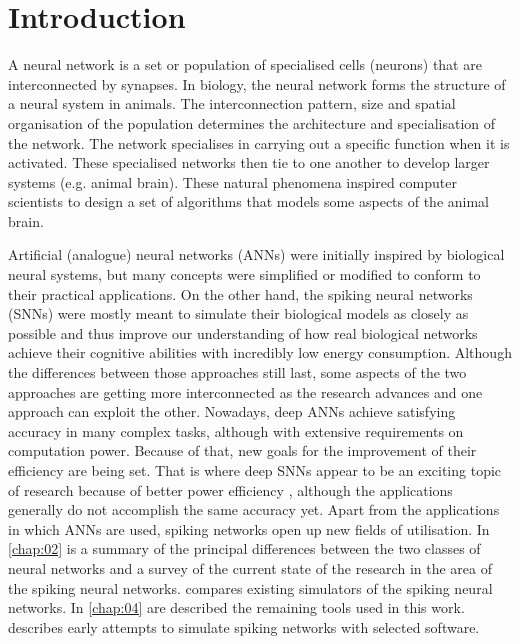\chapter{Introduction} \label{chap:01}

A neural network is a set or population of specialised cells (neurons) that are interconnected by synapses. In biology, the neural network forms the structure of a neural system in animals. The interconnection pattern, size and spatial organisation of the population determines the architecture and specialisation of the network. The network specialises in carrying out a specific function when it is activated. These specialised networks then tie to one another to develop larger systems (e.g. animal brain). These natural phenomena inspired computer scientists to design a set of algorithms that models some aspects of the animal brain. 

Artificial (analogue) neural networks (ANNs) were initially inspired by biological neural systems, but many concepts were simplified or modified to conform to their practical applications. On the other hand, the spiking neural networks (SNNs) were mostly meant to simulate their biological models as closely as possible and thus improve our understanding of how real biological networks achieve their cognitive abilities with incredibly low energy consumption. Although the differences between those approaches still last, some aspects of the two approaches are getting more interconnected as the research advances and one approach can exploit the other. Nowadays, deep ANNs achieve satisfying accuracy in many complex tasks, although with extensive requirements on computation power. Because of that, new goals for the improvement of their efficiency are being set. That is where deep SNNs appear to be an exciting topic of research because of better power efficiency \cite{caoSpikingDeepConvolutional2015, tavanaeiDeepLearningSpiking2019}, although the applications generally do not accomplish the same accuracy yet. Apart from the applications in which ANNs are used, spiking networks open up new fields of utilisation. In \cref{chap:02} is a summary of the principal differences between the two classes of neural networks and a survey of the current state of the research in the area of the spiking neural networks.  compares existing simulators of the spiking neural networks. In \cref{chap:04} are described the remaining tools used in this work.  describes early attempts to simulate spiking networks with selected software.
